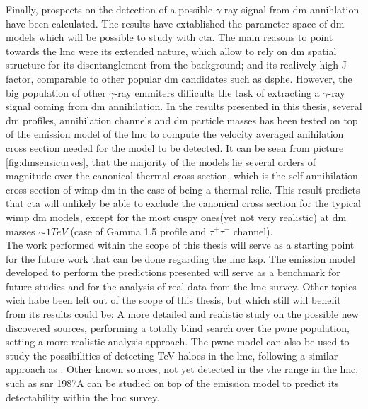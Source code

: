 \documentclass[main.tex]{subfiles}
\begin{document}
Finally, prospects on the detection of a possible $\gamma$-ray signal from \gls{dm} annihlation have been calculated. The results have extablished the parameter space of \gls{dm} models which will be possible to study with \gls{cta}. The main reasons to point towards the \gls{lmc} were its extended nature, which allow to rely on \gls{dm} spatial structure for its disentanglement from the background; and its realively high J-factor, comparable to other popular \gls{dm} candidates such as \gls{dsphe}. However, the big population of other $\gamma$-ray emmiters difficults the task of extracting a $\gamma$-ray signal coming from \gls{dm} annihilation. In the results presented in this thesis, several \gls{dm} profiles, annihilation channels and \gls{dm} particle masses has been tested on top of the emission model of the \gls{lmc} to compute the velocity averaged anihilation cross section needed for the model to be detected. It can be seen from picture \ref{fig:dmsensicurves}, that the majority of the models lie several orders of magnitude over the canonical thermal cross section, which is the self-annihilation cross section of \gls{wimp} \gls{dm} in the case of being a thermal relic. This result predicts that \gls{cta} will unlikely be able to exclude the canonical cross section for the typical \gls{wimp} \gls{dm} models, except for the most cuspy ones(yet not very realistic) at \gls{dm} masses $\sim 1 TeV$ (case of Gamma 1.5 profile and $\tau^+ \tau^-$ channel).\\

The work performed within the scope of this thesis will serve as a starting point for the future work that can be done regarding the \gls{lmc} \gls{ksp}. The emission model developed to perform the predictions presented will serve as a benchmark for future studies and for the analysis of real data from the \gls{lmc} survey.
Other topics wich habe been left out of the scope of this thesis, but which still will benefit from its results could be: A more detailed and realistic study on the possible new discovered sources, performing a totally blind search over the \gls{pwne} population, setting a more realistic analysis approach. The \gls{pwne} model can also be used to study the possibilities of detecting TeV haloes in the \gls{lmc}, following a similar approach as \cite{2019tevhalos}. 
Other known sources, not yet detected in the \gls{vhe} range in the \gls{lmc}, such as \gls{snr} 1987A can be studied on top of the emission model to predict its detectability within the \gls{lmc} survey.
\end{document}
